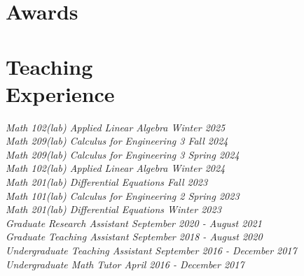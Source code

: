 \documentclass[margin]{res}
\begin{document}
\begin{resume}
\section{Awards}


\section{Teaching\\Experience}

\textsl{Math 102(lab) Applied Linear Algebra \hfill{Winter 2025}\\}
\textsl{Math 209(lab) Calculus for Engineering 3 \hfill{Fall 2024}\\}
\textsl{Math 209(lab) Calculus for Engineering 3 \hfill{Spring 2024}\\}
\textsl{Math 102(lab) Applied Linear Algebra \hfill{Winter 2024}\\}
\textsl{Math 201(lab) Differential Equations \hfill{Fall 2023}\\}
\textsl{Math 101(lab) Calculus for Engineering 2 \hfill{Spring 2023}\\}
\textsl{Math 201(lab) Differential Equations \hfill{Winter 2023}\\}
\textsl{Graduate Research Assistant \hfill{September 2020 - August 2021}\\}
\textsl{Graduate Teaching Assistant \hfill{September 2018 - August 2020}\\}
\textsl{Undergraduate Teaching Assistant \hfill{September 2016 - December 2017}\\}
\textsl{Undergraduate Math Tutor \hfill{April 2016 - December 2017}\\}






\end{resume}
\(\)
\end{document}
